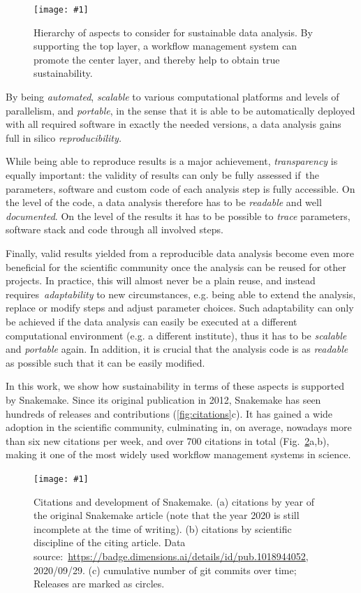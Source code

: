 \documentclass[parskip=half]{scrartcl}
\newcommand{\image}[1]{\centering\texttt{[image: \#1]}}
\let\plainurl\url
\renewcommand{\url}[1]{\protect\plainurl{#1}}
\begin{document}
\begin{figure}
	\image{sustainability-in-wms.pdf}
	\caption{
		Hierarchy of aspects to consider for sustainable data analysis.
		By supporting the top layer, a workflow management system can promote the center layer, and thereby help to obtain true sustainability.
	}\label{fig:sustainability}
\end{figure}

By being \emph{automated}, \emph{scalable} to various computational platforms and levels of parallelism, and \emph{portable}, in the sense that it is able to be automatically deployed with all required software in exactly the needed versions, a data analysis gains full in silico \emph{reproducibility.
}

While being able to reproduce results is a major achievement, \emph{transparency} is equally important: the validity of results can only be fully assessed if~the parameters, software and custom code of each analysis step is fully accessible.
On the level of the code, a data analysis therefore has to be \emph{readable} and well \emph{documented}.
On the level of the results it has to be possible to \emph{trace} parameters, software stack and code through all involved steps.

Finally, valid results yielded from a reproducible data analysis become even more beneficial for the scientific community once the analysis can be reused for other projects.
In practice, this will almost never be a plain reuse, and instead requires~\emph{adaptability} to new circumstances, e.g. being able to extend the analysis, replace or modify steps and adjust parameter choices.
Such adaptability can only be achieved if the data analysis can easily be executed at a different computational environment (e.g. a different institute), thus it has to be \emph{scalable} and \emph{portable} again.
In addition, it is crucial that the analysis code is as \emph{readable} as possible such that it can be easily modified.

In this work, we show how sustainability in terms of these aspects is supported by Snakemake.
Since its original publication in 2012, Snakemake has seen hundreds of releases and contributions (\autoref{fig:citations}c).
It has gained a wide adoption in the scientific community, culminating in, on average, nowadays more than six new citations per week, and over 700 citations in total (Fig.~\ref{fig:citations}a,b), making it one of the most widely used workflow management systems in science.

\begin{figure}
	\image{citations+development.pdf}
	\caption{
		Citations and development of Snakemake.
		(a) citations by year of the original Snakemake article (note that the year 2020 is still incomplete at the time of writing).
		(b) citations by scientific discipline of the citing article.
		Data source:~\url{https://badge.dimensions.ai/details/id/pub.1018944052}, 2020/09/29.
		(c) cumulative number of git commits over time; Releases are marked as circles.
	}
	\label{fig:citations}
\end{figure}
\end{document}
